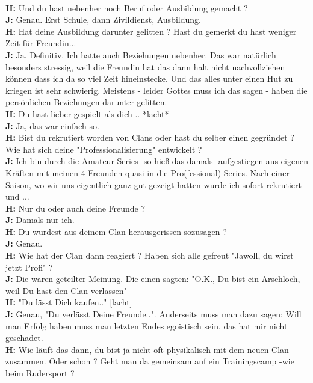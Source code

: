 \\ \textbf{H:} Und du hast nebenher noch Beruf oder Ausbildung gemacht ?
\\ \textbf{J:} Genau. Erst Schule, dann Zivildienst, Ausbildung.
\\ \textbf{H:} Hat deine Ausbildung darunter gelitten ? Hast du gemerkt du hast weniger Zeit für Freundin...
\\ \textbf{J:} Ja. Definitiv. Ich hatte auch Beziehungen nebenher. Das war natürlich besonders stressig, weil die Freundin hat das dann halt nicht nachvollziehen können dass ich da so viel Zeit hineinstecke. Und das alles unter einen Hut zu kriegen ist sehr schwierig. Meistens - leider Gottes muss ich das sagen - haben die persönlichen Beziehungen darunter gelitten.
\\ \textbf{H:} Du hast lieber gespielt als dich .. *lacht*
\\ \textbf{J:} Ja, das war einfach so.
\\ \textbf{H:} Bist du rekrutiert worden von Clans oder hast du selber einen gegründet ? Wie hat sich deine "Professionalisierung" entwickelt ?
\\ \textbf{J:} Ich bin durch die Amateur-Series -so hieß das damals- aufgestiegen aus eigenen Kräften mit meinen 4 Freunden quasi in die Pro(fessional)-Series. Nach einer Saison, wo wir uns eigentlich ganz gut gezeigt hatten wurde ich sofort rekrutiert und ...
\\ \textbf{H:} Nur du oder auch deine Freunde ?
\\ \textbf{J:} Damals nur ich.
\\ \textbf{H:} Du wurdest aus deinem Clan herausgerissen sozusagen ?
\\ \textbf{J:} Genau.
\\ \textbf{H:} Wie hat der Clan dann reagiert ? Haben sich alle gefreut "Jawoll, du wirst jetzt Profi" ?
\\ \textbf{J:} Die waren geteilter Meinung. Die einen sagten: "O.K., Du bist ein Arschloch, weil Du hast den Clan verlassen"
\\ \textbf{H:} "Du lässt Dich kaufen.." [lacht]
\\ \textbf{J:} Genau, "Du verlässt Deine Freunde..". Anderseits muss man dazu sagen: Will man Erfolg haben muss man letzten Endes egoistisch sein, das hat mir nicht geschadet.
\\ \textbf{H:} Wie läuft das dann, du bist ja nicht oft physikalisch mit dem neuen Clan zusammen. Oder schon ? Geht man da gemeinsam auf ein Trainingscamp -wie beim Rudersport ?
